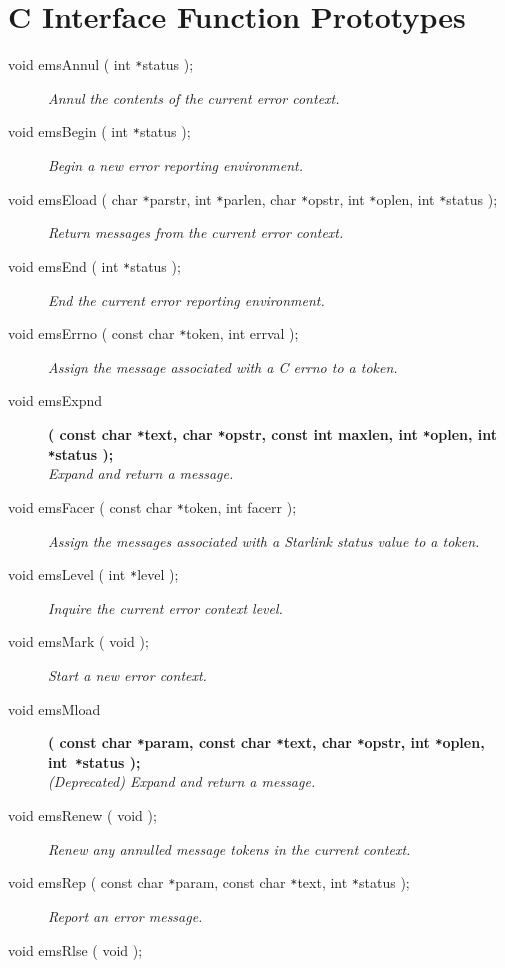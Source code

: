 \documentclass[twoside,11pt]{article}
\newcommand{\xlabel}[1]{}
\renewcommand{\_}{\texttt{\symbol{95}}}
\newcommand{\listline}{\hspace{1pt}\\}
\renewcommand{\listline}{}
\begin{document}
\newpage
\section{\xlabel{c_interface_function_prototypes}C Interface Function
Prototypes} \label{C_sect}
\begin {description} 
\item[void emsAnnul ( int \texttt{*}status );] \listline
\textit{Annul the contents of the current error context.}
\item[void emsBegin ( int \texttt{*}status );] \listline
\textit{Begin a new error reporting environment.}
\item[void emsEload
( char \texttt{*}parstr, int \texttt{*}parlen, char \texttt{*}opstr, 
int \texttt{*}oplen, int \texttt{*}status );] \listline
\textit{Return messages from the current error context.}
\item[void emsEnd ( int \texttt{*}status );] \listline
\textit{End the current error reporting environment.}
\item[void emsErrno ( const char \texttt{*}token, int errval );] \listline
\textit{Assign the message associated with a C errno to a token.}
\item[void emsExpnd] \listline
\textbf{( const char \texttt{*}text, char \texttt{*}opstr,
const int maxlen, int \texttt{*}oplen, int \texttt{*}status );} \\
\textit{Expand and return a message.}
\item[void emsFacer ( const char \texttt{*}token, int facerr );] \listline
\textit{Assign the messages associated with a Starlink status value to a
token.}
\item[void emsLevel ( int \texttt{*}level );] \listline
\textit{Inquire the current error context level.}
\item[void emsMark ( void );] \listline
\textit{Start a new error context.}
\item[void emsMload] \listline 
\textbf{( const char \texttt{*}param, const char \texttt{*}text, 
char \texttt{*}opstr, int \texttt{*}oplen, int~\texttt{*}status );} \\
\textit{(Deprecated) Expand and return a message.}
\item[void emsRenew ( void );] \listline
\textit{Renew any annulled message tokens in the current context.}
\item[void emsRep ( const char \texttt{*}param, const char \texttt{*}text, 
int \texttt{*}status );] \listline
\textit{Report an error message.}
\item[void emsRlse ( void );] \listline

\end{description}
\end{document}
